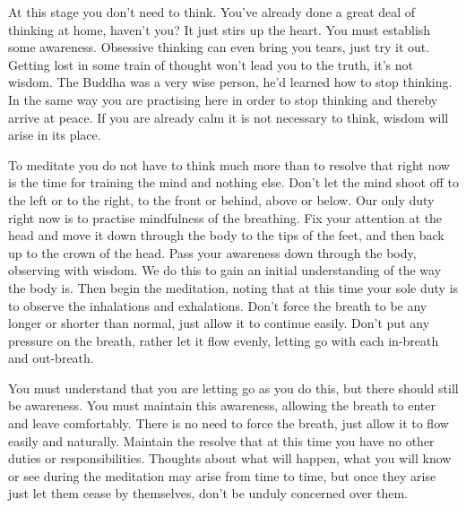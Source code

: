 At this stage you don't need to think. You've already done a great deal of thinking at home, haven't you? It just stirs up the heart. You must establish some awareness. Obsessive thinking can even bring you tears, just try it out. Getting lost in some train of thought won't lead you to the truth, it's not wisdom. The Buddha was a very wise person, he'd learned how to stop thinking. In the same way you are practising here in order to stop thinking and thereby arrive at peace. If you are already calm it is not necessary to think, wisdom will arise in its place. 

To meditate you do not have to think much more than to resolve that right now is the time for training the mind and nothing else. Don't let the mind shoot off to the left or to the right, to the front or behind, above or below. Our only duty right now is to practise mindfulness of the breathing. Fix your attention at the head and move it down through the body to the tips of the feet, and then back up to the crown of the head. Pass your awareness down through the body, observing with wisdom. We do this to gain an initial understanding of the way the body is. Then begin the meditation, noting that at this time your sole duty is to observe the inhalations and exhalations. Don't force the breath to be any longer or shorter than normal, just allow it to continue easily. Don't put any pressure on the breath, rather let it flow evenly, letting go with each in-breath and out-breath. 

You must understand that you are letting go as you do this, but there should still be awareness. You must maintain this awareness, allowing the breath to enter and leave comfortably. There is no need to force the breath, just allow it to flow easily and naturally. Maintain the resolve that at this time you have no other duties or responsibilities. Thoughts about what will happen, what you will know or see during the meditation may arise from time to time, but once they arise just let them cease by themselves, don't be unduly concerned over them. 


